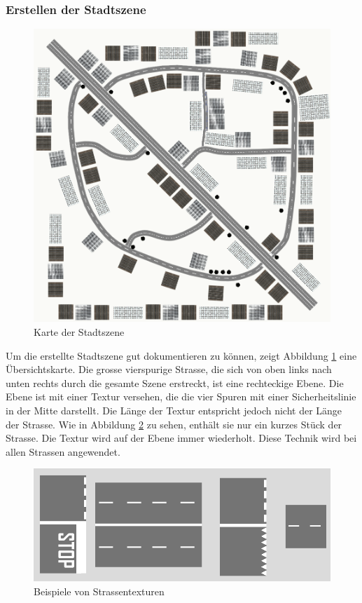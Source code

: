 \subsubsection{Erstellen der Stadtszene}
\begin{figure}[H]
\centering 
\includegraphics[width=1\linewidth]{src/CityWorld_map.png}
\caption{Karte der Stadtszene} %
\label{CityWorld_map} %
\end{figure}
Um die erstellte Stadtszene gut dokumentieren zu können, zeigt Abbildung \ref{CityWorld_map} eine Übersichtskarte. Die grosse vierspurige Strasse, die sich von oben links nach unten rechts durch die gesamte Szene erstreckt, ist eine rechteckige Ebene. Die Ebene ist mit einer Textur versehen, die die vier Spuren mit einer Sicherheitslinie in der Mitte darstellt. Die Länge der Textur entspricht jedoch nicht der Länge der Strasse. Wie in Abbildung \ref{examples_street_textures} zu sehen, enthält sie nur ein kurzes Stück der Strasse. Die Textur wird auf der Ebene immer wiederholt. Diese Technik wird bei allen Strassen angewendet.\\
\begin{figure}[H]
\centering 
\includegraphics[scale=0.6]{src/examples_street_textures.png}
\caption{Beispiele von Strassentexturen} %
\label{examples_street_textures} %
\end{figure}
